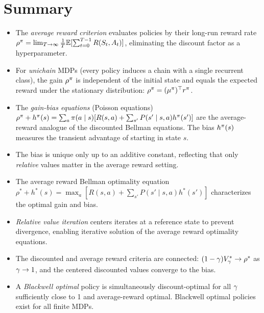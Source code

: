 \documentclass[11pt,a4paper]{article}
\begin{document}
\section{Summary}
\label{sec:summary}

\begin{itemize}
    \item The \emph{average reward criterion} evaluates policies by
    their long-run reward rate
    $\rho^\pi = \lim_{T \to \infty} \frac{1}{T}
    \mathbb{E}[\sum_{t=0}^{T-1} R(S_t, A_t)]$, eliminating the discount
    factor as a hyperparameter.
    \item For \emph{unichain} MDPs (every policy induces a chain
    with a single recurrent class), the gain $\rho^\pi$ is
    independent of the initial state and equals the expected reward
    under the stationary distribution:
    $\rho^\pi = (\mu^\pi)^\top r^\pi$.
    \item The \emph{gain-bias equations} (Poisson equations)
    $\rho^\pi + h^\pi(s) = \sum_a \pi(a \mid s)
    [R(s,a) + \sum_{s'} P(s' \mid s,a) h^\pi(s')]$ are the
    average-reward analogue of the discounted Bellman equations.
    The bias $h^\pi(s)$ measures the transient advantage of
    starting in state $s$.
    \item The bias is unique only up to an additive constant,
    reflecting that only \emph{relative} values matter in the
    average reward setting.
    \item The average reward Bellman optimality equation
    $\rho^* + h^*(s) = \max_a [R(s,a) + \sum_{s'} P(s' \mid s,a)
    h^*(s')]$ characterizes the optimal gain and bias.
    \item \emph{Relative value iteration} centers iterates at a
    reference state to prevent divergence, enabling iterative
    solution of the average reward optimality equations.
    \item The discounted and average reward criteria are connected:
    $(1-\gamma)V^*_\gamma \to \rho^*$ as
    $\gamma \to 1$, and the centered discounted values converge
    to the bias.
    \item A \emph{Blackwell optimal} policy is simultaneously
    discount-optimal for all $\gamma$ sufficiently close to 1
    and average-reward optimal. Blackwell optimal policies exist
    for all finite MDPs.
\end{itemize}

\end{document}
